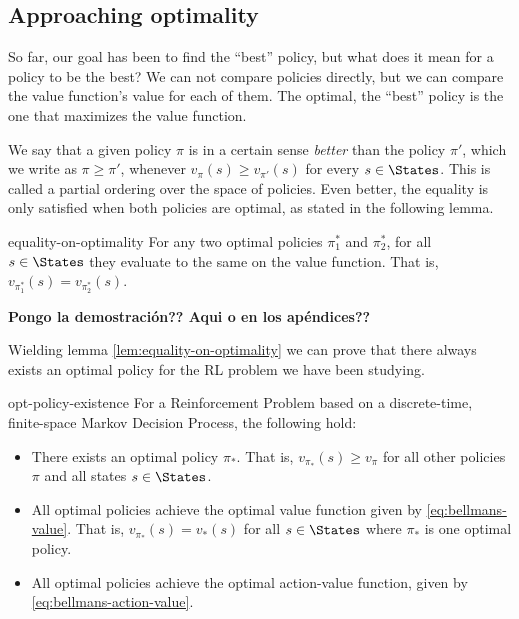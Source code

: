 \subsection{Approaching optimality}
So far, our goal has been to find the ``best'' policy, but what does it mean for
a policy to be the best? We can not compare policies directly, but we can
compare the value function's value for each of them. The optimal, the
``best'' policy is the one that maximizes the value function.

We say that a given policy $\pi$ is in a certain sense \textit{better} than the
policy $\pi'$, which we write as $\pi \geq \pi'$, whenever $v_\pi(s) \geq
v_{\pi'} (s)$ for every $s \in \States$. This is called a partial ordering over
the space of policies. Even better, the equality is only satisfied when both
policies are optimal, as stated in the following lemma.

\begin{lemma}{}{equality-on-optimality}
    For any two optimal policies $\pi^{*}_{1}$ and $\pi^{*}_{2}$, for all $s \in
    \States$ they evaluate to the same on the value function. That is,
    $v_{\pi^{*}_{1}} (s) = v_{\pi^{*}_{2}} (s)$.
\end{lemma}

{
    \bfseries
    \centering
    Pongo la demostración?? Aqui o en los apéndices??
}

Wielding lemma \ref{lem:equality-on-optimality} we can prove that there always
exists an optimal policy for the RL problem we have been studying.

\begin{thrm}{}{opt-policy-existence}
    For a Reinforcement Problem based on a discrete-time, finite-space Markov Decision Process, the following hold:
    \begin{itemize}
        \item There exists an optimal policy $\pi_*$. That is, $v_{\pi_*} (s)
            \geq v_{\pi}$ for all other policies $\pi$ and all states $s \in
            \States$.
        \item All optimal policies achieve the optimal value function given by
            \eqref{eq:bellmans-value}. That is, $v_{\pi_*}(s) = v_* (s)$ for all
            $s \in \States$ where $\pi_*$ is one optimal policy.
        \item All optimal policies achieve the optimal action-value function,
            given by \eqref{eq:bellmans-action-value}.
    \end{itemize}
\end{thrm}

